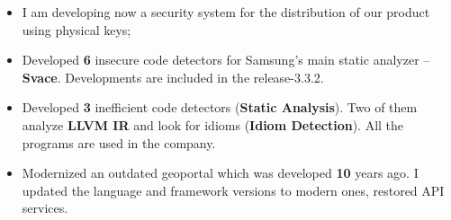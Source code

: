 \documentclass[10pt,a4paper,ragged2e,withhyper]{custom-altacv}
\begin{document}


\makecvheader



\begin{paracol}{2}


\begin{itemize}
	\item I am developing now a security system for the distribution of our product using physical keys;
	\item Developed \textbf{6} insecure code detectors for Samsung's main static analyzer -- \textbf{Svace}. Developments are included in the release-3.3.2.
\end{itemize}

\divider


\begin{itemize}
	\item Developed \textbf{3} inefficient code detectors (\textbf{Static Analysis}). Two of them analyze \textbf{LLVM IR} and look for idioms (\textbf{Idiom Detection}). All the programs are used in the company.
\end{itemize}

\divider


\begin{itemize}
	\item Modernized an outdated geoportal which was developed \textbf{10} years ago. I updated the language and framework versions to modern ones, restored API services.
\end{itemize}



\end{paracol}
\end{document}
